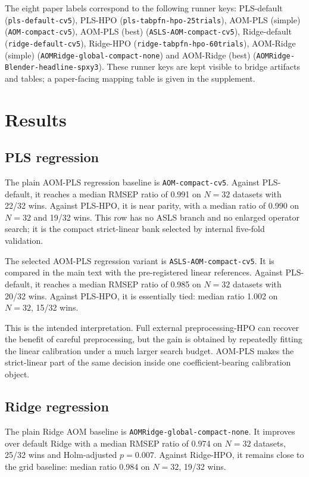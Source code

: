 \documentclass[11pt,a4paper]{article}
\begin{document}
The eight paper labels correspond to the following runner keys:
PLS-default (\texttt{pls-default-cv5}), PLS-HPO
(\texttt{pls-tabpfn-hpo-25trials}), AOM-PLS (simple)
(\texttt{AOM-compact-cv5}), AOM-PLS (best)
(\texttt{ASLS-AOM-compact-cv5}), Ridge-default
(\texttt{ridge-default-cv5}), Ridge-HPO
(\texttt{ridge-tabpfn-hpo-60trials}), AOM-Ridge (simple)
(\texttt{AOMRidge-global-compact-none}) and AOM-Ridge (best)
(\texttt{AOMRidge-Blender-headline-spxy3}).  These runner keys are kept
visible to bridge artifacts and tables; a paper-facing mapping table is given
in the supplement.

\section{Results}

\subsection{PLS regression}

The plain AOM-PLS regression baseline is \texttt{AOM-compact-cv5}.  Against
PLS-default, it reaches a median RMSEP ratio of 0.991 on $N=32$ datasets with
22/32 wins.  Against PLS-HPO, it is near parity, with a median ratio of
0.990 on $N=32$ and 19/32 wins.  This row has no ASLS branch
and no enlarged operator search; it is the compact strict-linear bank selected
by internal five-fold validation.

The selected AOM-PLS regression variant is \texttt{ASLS-AOM-compact-cv5}.  It
is compared in the main text with the pre-registered linear references.
Against PLS-default, it reaches a median RMSEP ratio of 0.985 on $N=32$
datasets with 20/32 wins.  Against PLS-HPO, it is essentially tied:
median ratio 1.002 on $N=32$, 15/32 wins.

This is the intended interpretation.  Full external preprocessing-HPO can
recover the benefit of careful preprocessing, but the gain is obtained by
repeatedly fitting the linear calibration under a much larger search budget.
AOM-PLS makes the strict-linear part of the same decision inside one
coefficient-bearing calibration object.

\subsection{Ridge regression}

The plain Ridge AOM baseline is \texttt{AOMRidge-global-compact-none}.  It
improves over default Ridge with a median RMSEP ratio of 0.974 on $N=32$
datasets, 25/32 wins and Holm-adjusted $p=0.007$.  Against Ridge-HPO, it
remains close to the grid baseline: median ratio 0.984 on $N=32$, 19/32 wins.
\end{document}
